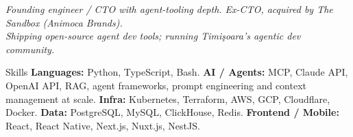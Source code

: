 \documentclass{resume}
\begin{document}
\begin{center}
\em Founding engineer / CTO with agent-tooling depth. Ex-CTO, acquired by The Sandbox (Animoca Brands).\\
Shipping open-source agent dev tools; running Timi\c{s}oara's agentic dev community.
\end{center}
\smallskip

\begin{rSection}{Skills}
\textbf{Languages:} Python, TypeScript, Bash. \textbf{AI / Agents:} MCP, Claude API, OpenAI API, RAG, agent frameworks, prompt engineering and context management at scale. \textbf{Infra:} Kubernetes, Terraform, AWS, GCP, Cloudflare, Docker. \textbf{Data:} PostgreSQL, MySQL, ClickHouse, Redis. \textbf{Frontend / Mobile:} React, React Native, Next.js, Nuxt.js, NestJS.
\end{rSection}
\end{document}
